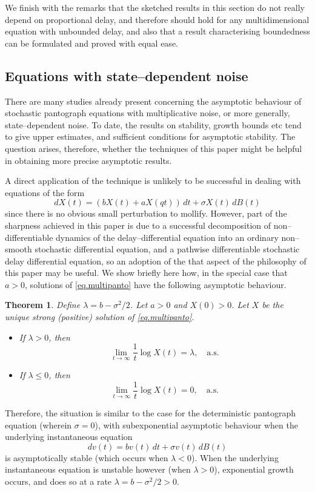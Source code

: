 \documentclass[a4paper,10pt,reqno]{amsart}
\numberwithin{equation}{section}
\newtheorem{theorem}{Theorem}
\theoremstyle{definition}
\theoremstyle{remark}
\DeclareMathOperator{\1}{\mathbbm 1}
\begin{document}
We finish with the remarks that the sketched results in this section do not really depend on proportional delay, and therefore should hold for any multidimensional equation with unbounded delay, and also that a result characterising boundedness can be formulated and proved with equal ease. 

\subsection{Equations with state--dependent noise}

There are many studies already present concerning the asymptotic behaviour of stochastic pantograph equations with multiplicative noise, or more generally, state--dependent noise. To date, the results on stability, growth bounds etc tend to give upper estimates, and sufficient conditions for asymptotic stability. The question arises, therefore, whether the techniques of this paper might be helpful in obtaining more precise asymptotic results. 

A direct application of the technique is unlikely to be successful in dealing with equations of the form 
\begin{equation} \label{eq.multipanto}
dX(t)=(bX(t)+aX(qt))\,dt+\sigma X(t)\,dB(t)
\end{equation}
since there is no obvious small perturbation to mollify. However, part of the sharpness achieved in this paper is due to 
a successful decomposition of non--differentiable dynamics of the delay--differential equation into an ordinary non--smooth stochastic differential equation, and a pathwise differentiable stochastic delay differential equation, so an adoption of the that aspect of the philosophy of this paper may be useful. We show briefly here how, in the special case that $a>0$, solutions of \eqref{eq.multipanto} have the following asymptotic behaviour. 
\begin{theorem}
Define $\lambda=b-\sigma^2/2$. Let $a>0$ and $X(0)>0$. Let $X$ be the unique strong (positive) solution of \eqref{eq.multipanto}.
\begin{itemize}
	\item[(a)] If $\lambda>0$, then 
	\[
	\lim_{t\to\infty} \frac{1}{t}\log X(t)=\lambda,\quad \text{a.s.}
	\]
	\item[(b)] If $\lambda\leq 0$, then 
	\[
	\lim_{t\to\infty} \frac{1}{t}\log X(t)=0,\quad \text{a.s.}
	\]
\end{itemize}
\end{theorem}
Therefore, the situation is similar to the case for the deterministic pantograph equation (wherein $\sigma=0$), with subexponential asymptotic behaviour when the underlying instantaneous equation 
\[
dv(t)=bv(t)\,dt+\sigma v(t)\,dB(t)
\]
is asymptotically stable (which occurs when $\lambda<0$). When the underlying instantaneous equation is unstable however (when $\lambda>0$), exponential growth occurs, and does so at a rate $\lambda=b-\sigma^2/2>0$.
\end{document}
